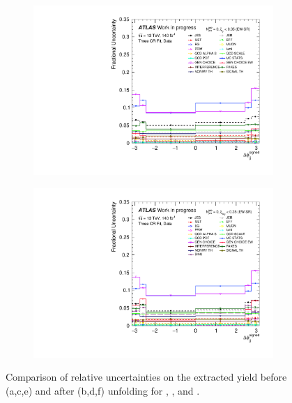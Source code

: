 \begin{figure}[t]
\begin{subfigure}[b]{0.48\textwidth}
    \includegraphics[width=\textwidth]{plots/diffx/final/data/3cr/Systematic_Uncertainties_data_jj_dphi_3cr_QCD_Sh2211_0p01sigma.pdf}
    \caption{}
\end{subfigure}
\hfill
\begin{subfigure}[b]{0.48\textwidth}
    \centering
    \includegraphics[width=\textwidth]{plots/diffx/final/unfolded/3cr/Systematic_Uncertainties_data_unfolded_jj_dphi_3cr_QCD_Sh2211_0p01sigma.pdf}
    \caption{}
\end{subfigure}
\caption{Comparison of relative uncertainties on the extracted \ewwy yield before (a,c,e) and after (b,d,f) unfolding for \mjj, \jjpt, and \jjdphi.\label{fig:vbswy:unfcomp1}}
\end{figure}

